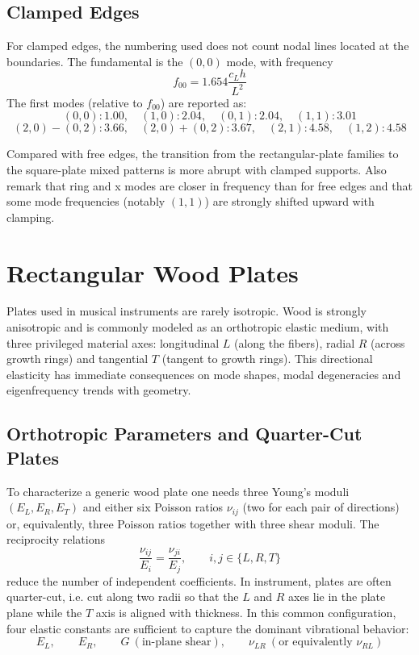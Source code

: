 \subsection{Clamped Edges}

For clamped edges, the numbering used does not count nodal lines located at the boundaries. The fundamental is the \( (0,0) \) mode, with frequency
\[
f_{00} = 1.654\frac{c_L h}{L^{2}}
\]
The first modes (relative to \( f_{00} \)) are reported as:
\[
(0,0):1.00,\quad
(1,0):2.04,\quad
(0,1):2.04,\quad
(1,1):3.01
\]
\[
(2,0)-(0,2):3.66,\quad
(2,0)+(0,2):3.67,\quad
(2,1):4.58,\quad
(1,2):4.58
\]

Compared with free edges, the transition from the rectangular-plate families to the square-plate mixed patterns is more abrupt with clamped supports. Also remark that ring and x modes are closer in frequency than for free edges and that some mode frequencies (notably \( (1,1) \)) are strongly shifted upward with clamping.

\section{Rectangular Wood Plates}

Plates used in musical instruments are rarely isotropic. Wood is strongly anisotropic and is commonly modeled as an orthotropic elastic medium, with three privileged material axes: longitudinal \( L \) (along the fibers), radial \( R \) (across growth rings) and tangential \( T \) (tangent to growth rings). This directional elasticity has immediate consequences on mode shapes, modal degeneracies and eigenfrequency trends with geometry.

\subsection{Orthotropic Parameters and Quarter-Cut Plates}

To characterize a generic wood plate one needs three Young's moduli \( (E_L,E_R,E_T) \) and either six Poisson ratios \( \nu_{ij} \) (two for each pair of directions) or, equivalently, three Poisson ratios together with three shear moduli. The reciprocity relations
\[
\frac{\nu_{ij}}{E_i} = \frac{\nu_{ji}}{E_j},
\qquad i,j\in\{L,R,T\}
\]
reduce the number of independent coefficients. In instrument, plates are often quarter-cut, i.e. cut along two radii so that the \( L \) and \( R \) axes lie in the plate plane while the \( T \) axis is aligned with thickness. In this common configuration, four elastic constants are sufficient to capture the dominant vibrational behavior:
\[
E_L,\qquad E_R,\qquad G \ (\text{in-plane shear}),\qquad \nu_{LR}\ (\text{or equivalently } \nu_{RL})
\]

